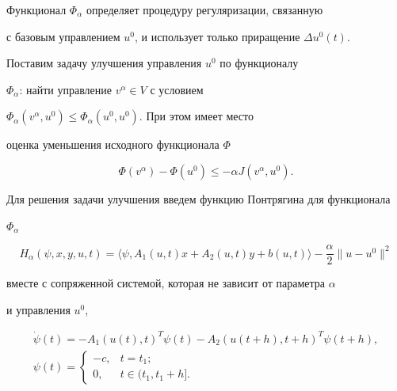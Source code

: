 Функционал $\Phi_\alpha$ определяет процедуру регуляризации, связанную


с базовым управлением $u^0$, и использует только приращение $\Delta u^0(t)$.





Поставим задачу улучшения управления $u^0$ по функционалу


$\Phi_\alpha$: найти управление $v^\alpha\in V$ с условием


$\Phi_\alpha(v^\alpha,u^0)\leq\Phi_\alpha(u^0,u^0)$. При этом имеет место


оценка уменьшения исходного функционала $\Phi$


\begin{equation}


\Phi(v^\alpha)-\Phi(u^0)\leq-\alpha J(v^\alpha,u^0).


\label{eq:z23}


\end{equation}





Для решения задачи улучшения введем функцию Понтрягина для функционала


$\Phi_\alpha$


$$


H_\alpha(\psi,x,y,u,t)=\langle \psi,A_1(u,t)x+A_2(u,t)y+


b(u,t)\rangle -\frac{\alpha}{2}\|u-u^0\|^2


$$


вместе с сопряженной системой, которая не зависит от параметра $\alpha$


и управления $u^0$,


\begin{equation}


\begin{array}{c}


\Dot{\psi}(t)=-A_1(u(t),t)^T\psi(t)-A_2(u(t+h),t+h)^T\psi(t+h), \\[3mm]


\psi(t)=


\begin{cases}


-c,& t=t_1;\\


0,& t\in(t_1,t_1+h].


\end{cases}


\end{array}


\label{eq:z24}


\end{equation}


